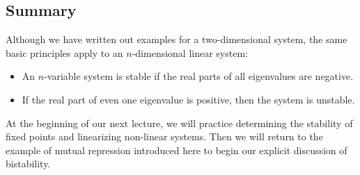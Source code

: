 \documentclass{article}
\begin{document}
\subsection*{Summary}

Although we have written out examples for a two-dimensional system, the same basic principles apply to an $n$-dimensional linear system:

\begin{itemize}

\item An $n$-variable system is stable if the real parts of all eigenvalues are negative.
\item If the real part of even one eigenvalue is positive, then the system is unstable.

\end{itemize}

At the beginning of our next lecture, we will practice determining the stability of fixed points and linearizing non-linear systems. Then we will return to the example of mutual repression introduced here to begin our explicit discussion of bistability.
\end{document}
